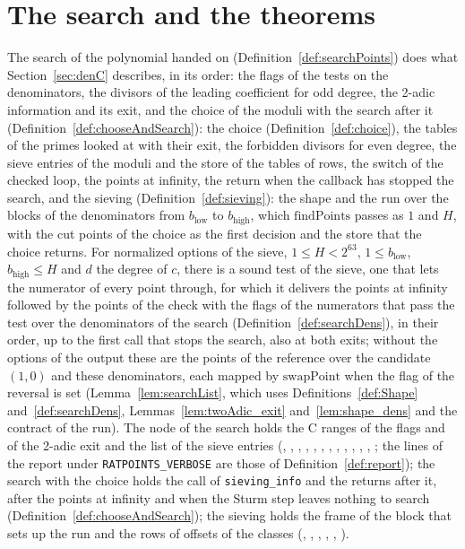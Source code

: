 \section{The search and the theorems}\label{sec:denSearch}

The search of the polynomial handed on (Definition~\ref{def:searchPoints}) does what
Section~\ref{sec:denC} describes, in its order: the flags of the tests on the denominators, the
divisors of the leading coefficient for odd degree, the 2-adic information and its exit, and the
choice of the moduli with the search after it (Definition~\ref{def:chooseAndSearch}): the choice
(Definition~\ref{def:choice}), the tables of the primes looked at with their exit, the forbidden
divisors for even degree, the sieve entries of the moduli and the store of the tables of rows, the
switch of the checked loop, the points at infinity, the return when the callback has stopped the
search, and the sieving (Definition~\ref{def:sieving}): the shape and the run over the blocks of the
denominators from $b_{\mathrm{low}}$ to $b_{\mathrm{high}}$, which $\mathrm{findPoints}$ passes as
$1$ and $H$, with the cut points of the choice as the first decision and the store that the choice
returns. For normalized options of the sieve, $1 \le H < 2^{63}$, $1 \le b_{\mathrm{low}}$,
$b_{\mathrm{high}} \le H$ and $d$ the degree of $c$, there is a sound test of the sieve, one that
lets the numerator of every point through, for which it delivers the points at infinity followed by
the points of the check with the flags of the numerators that pass the test over the denominators of
the search (Definition~\ref{def:searchDens}), in their order, up to the first call that stops the
search, also at both exits; without the options of the output these are the points of the reference
over the candidate $(1, 0)$ and these denominators, each mapped by $\mathrm{swapPoint}$ when the
flag of the reversal is set (Lemma~\ref{lem:searchList}, which uses Definitions~\ref{def:Shape}
and~\ref{def:searchDens}, Lemmas~\ref{lem:twoAdic_exit} and~\ref{lem:shape_dens} and the contract of
the run). The node of the search holds the C ranges of the flags and of the 2-adic exit and the list
of the sieve entries (, ,
, ,
, ,
, ,
, ,
, ,
; the lines of the report under \verb|RATPOINTS_VERBOSE| are
those of Definition~\ref{def:report}); the search with
the choice holds the call of \verb|sieving_info| and the returns after it, after the points at
infinity and when the Sturm step leaves nothing to search (Definition~\ref{def:chooseAndSearch});
the sieving holds the frame of the block that sets up the run and the rows of offsets of the classes
(, ,
, ,
, ).

